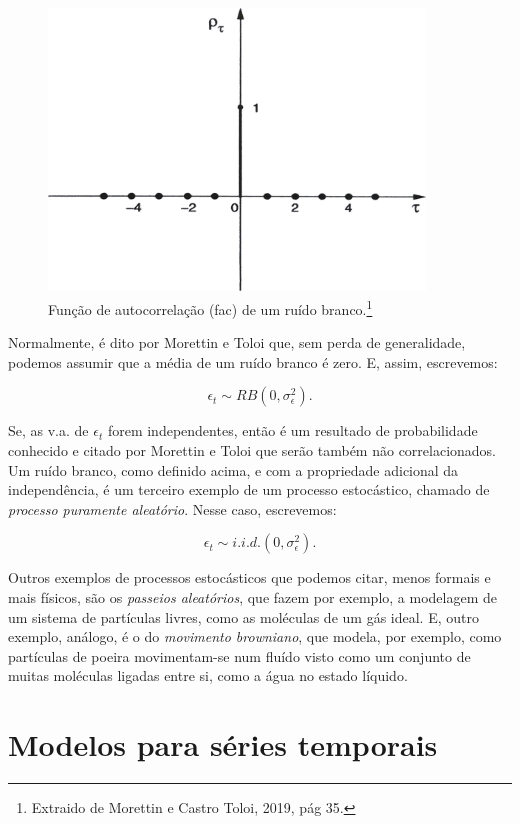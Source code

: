 \begin{figure}[htb]
\centering
\includegraphics[width=10cm]{figuras/fac_ruido}
\caption{Função de autocorrelação (fac) de um ruído branco.\footnote{Extraido de Morettin e Castro Toloi, 2019, pág 35.}}
\label{fig:fac_ruido}
\end{figure}

Normalmente, é dito por Morettin e Toloi \citep{morettin} que, sem perda de generalidade, podemos assumir que a média de um ruído branco é zero. E, assim, escrevemos:

\[ \epsilon_t \sim RB (0, \sigma_\epsilon^2). \]

Se, as v.a. de $\epsilon_t$ forem independentes, então é um resultado de probabilidade conhecido e citado por Morettin e Toloi \citep{morettin} que serão também não correlacionados. Um ruído branco, como definido acima, e com a propriedade adicional da independência, é um terceiro exemplo de um processo estocástico, chamado de \emph{processo puramente aleatório}. Nesse caso, escrevemos:

\[ \epsilon_t \sim i.i.d. (0, \sigma_\epsilon^2). \]

Outros exemplos de processos estocásticos que podemos citar, menos formais e mais físicos, são os \emph{passeios aleatórios}, que fazem por exemplo, a modelagem de um sistema de partículas livres, como as moléculas de um gás ideal. E, outro exemplo, análogo, é o do \emph{movimento browniano}, que modela, por exemplo, como partículas de poeira movimentam-se num fluído visto como um conjunto de muitas moléculas ligadas entre si, como a água no estado líquido.

\section{Modelos para séries temporais}

